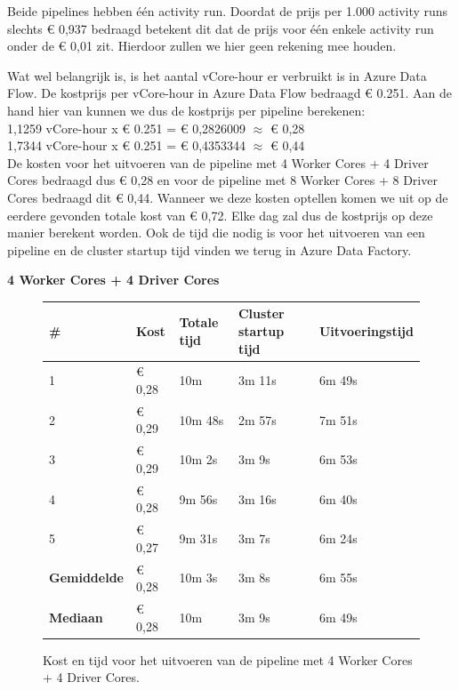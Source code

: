 Beide pipelines hebben één activity run. Doordat de prijs per 1.000 activity runs slechts € 0,937 bedraagd betekent dit dat de prijs voor één enkele activity run onder de € 0,01 zit. Hierdoor zullen we hier geen rekening mee houden.

Wat wel belangrijk is, is het aantal vCore-hour er verbruikt is in Azure Data Flow. De kostprijs per vCore-hour in Azure Data Flow bedraagd € 0.251. Aan de hand hier van kunnen we dus de kostprijs per pipeline berekenen:\\


1,1259 vCore-hour x € 0.251 = € 0,2826009 $\approx$ € 0,28\\


1,7344 vCore-hour x € 0.251 = € 0,4353344 $\approx$ € 0,44\\


De kosten voor het uitvoeren van de pipeline met 4 Worker Cores + 4 Driver Cores bedraagd dus € 0,28 en voor de pipeline met 8 Worker Cores + 8 Driver Cores bedraagd dit € 0,44. Wanneer we deze kosten optellen komen we uit op de eerdere gevonden totale kost van € 0,72. Elke dag zal dus de kostprijs op deze manier berekent worden. Ook de tijd die nodig is voor het uitvoeren van een pipeline en de cluster startup tijd vinden we terug in Azure Data Factory. 


\textbf{4 Worker Cores + 4 Driver Cores}

\begin{figure}[H]%
    \centering
    \begin{tabularx}{1\textwidth}{ |X|X|X|X|X| }
        \hline
        \textbf{\#} & \textbf{Kost} & \textbf{Totale tijd} & \textbf{Cluster startup tijd} & \textbf{Uitvoeringstijd} \\
        \hline 
        1 & € 0,28 & 10m & 3m 11s & 6m 49s  \\
        \hline
        2 & € 0,29 & 10m 48s & 2m 57s & 7m 51s \\
        \hline
        3 & € 0,29 & 10m 2s & 3m 9s & 6m 53s \\
        \hline
        4 & € 0,28 & 9m 56s & 3m 16s & 6m 40s \\
        \hline
        5 & € 0,27 & 9m 31s & 3m 7s & 6m 24s \\
        \hline
        \textbf{Gemiddelde} & € 0,28 & 10m 3s & 3m 8s & 6m 55s \\
        \hline
        \textbf{Mediaan} & € 0,28 & 10m & 3m 9s & 6m 49s \\
        \hline
    \end{tabularx}
    \caption{Kost en tijd voor het uitvoeren van de pipeline met 4 Worker Cores + 4 Driver Cores.}
\end{figure}


